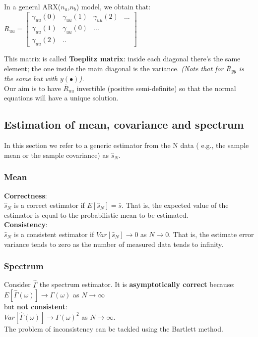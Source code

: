 \documentclass[10pt,a4paper]{article}
\begin{document}
In a general ARX($n_a$,$n_b$) model, we obtain that:
\center
 $\bar{R}_{uu}= \begin{bmatrix}
\gamma_{uu}(0) & \gamma_{uu}(1) & \gamma_{uu}(2) & ...\\
\gamma_{uu}(1) & \gamma_{uu}(0) & ... \\
\gamma_{uu}(2) & ..
\end{bmatrix}$
\\ \raggedright \vspace{0.5em}
This matrix is called \textbf{Toeplitz matrix}: inside each diagonal there's the same element; the one inside the main diagonal is the variance. \textit{(Note that for $\bar{R}_{yy}$ is the same but with $y(\bullet)$).} \\
Our aim is to have $\bar{R}_{uu}$ invertible (positive semi-definite) so that the normal equations will have a unique solution.
\subsection{Estimation of mean, covariance and spectrum}
In this section we refer to a generic estimator from the N data ( e.g., the sample mean or the sample covariance) as $\hat{s}_N$. \\
\subsubsection{Mean}
\textbf{Correctness}: \\
$\hat{s}_N$ is a correct estimator if $E[\hat{s}_N]=\bar{s}$. That is, the expected value of the estimator is equal to the probabilistic mean to be estimated. \\
\textbf{Consistency}: \\
$\hat{s}_N$ is a consistent estimator if $Var[\hat{s}_N] \rightarrow 0$ as $N \rightarrow 0$. That is, the estimate error variance tends to zero as the number of measured data tends to infinity.
\subsubsection{Spectrum}
Consider $\hat{\Gamma}$ the spectrum estimator. It is \textbf{asymptotically correct} because: \\ $E[\hat{\Gamma}(\omega)] \rightarrow \Gamma(\omega)$ as $N \rightarrow \infty$ \\ but \textbf{not consistent}: \\ $Var[\hat{\Gamma}(\omega)] \rightarrow \Gamma(\omega)^2$ as $N \rightarrow \infty$. \\ The problem of inconsistency can be tackled using the Bartlett method.
\end{document}
